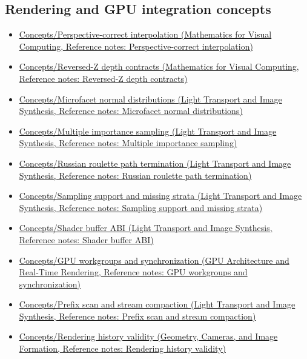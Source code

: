 \subsection{Rendering and GPU integration concepts}\label{appendix-a6d556a4ef50-rendering-and-gpu-integration-concepts}

\begin{itemize}
\tightlist
\item
  \href{../02-Mathematics-for-Visual-Computing/main.pdf\#nameddest=appendix-1ed5f96c73ea}{Concepts/Perspective-correct interpolation (Mathematics for Visual Computing, Reference notes: Perspective-correct interpolation)}
\item
  \href{../02-Mathematics-for-Visual-Computing/main.pdf\#nameddest=appendix-275ec8847057}{Concepts/Reversed-Z depth contracts (Mathematics for Visual Computing, Reference notes: Reversed-Z depth contracts)}
\item
  \href{../04-Light-Transport-and-Image-Synthesis/main.pdf\#nameddest=appendix-885c1cb64ae9}{Concepts/Microfacet normal distributions (Light Transport and Image Synthesis, Reference notes: Microfacet normal distributions)}
\item
  \href{../04-Light-Transport-and-Image-Synthesis/main.pdf\#nameddest=appendix-ca8898faf1a6}{Concepts/Multiple importance sampling (Light Transport and Image Synthesis, Reference notes: Multiple importance sampling)}
\item
  \href{../04-Light-Transport-and-Image-Synthesis/main.pdf\#nameddest=appendix-7277c62d4599}{Concepts/Russian roulette path termination (Light Transport and Image Synthesis, Reference notes: Russian roulette path termination)}
\item
  \href{../04-Light-Transport-and-Image-Synthesis/main.pdf\#nameddest=appendix-10308c3d753e}{Concepts/Sampling support and missing strata (Light Transport and Image Synthesis, Reference notes: Sampling support and missing strata)}
\item
  \href{../04-Light-Transport-and-Image-Synthesis/main.pdf\#nameddest=appendix-749048795dbb}{Concepts/Shader buffer ABI (Light Transport and Image Synthesis, Reference notes: Shader buffer ABI)}
\item
  \href{../06-GPU-Architecture-and-Real-Time-Rendering/main.pdf\#nameddest=appendix-f662b5b1773b}{Concepts/GPU workgroups and synchronization (GPU Architecture and Real-Time Rendering, Reference notes: GPU workgroups and synchronization)}
\item
  \href{../04-Light-Transport-and-Image-Synthesis/main.pdf\#nameddest=appendix-f2ee4d086415}{Concepts/Prefix scan and stream compaction (Light Transport and Image Synthesis, Reference notes: Prefix scan and stream compaction)}
\item
  \href{../03-Geometry-Cameras-and-Image-Formation/main.pdf\#nameddest=appendix-2e7e9fd28a2c}{Concepts/Rendering history validity (Geometry, Cameras, and Image Formation, Reference notes: Rendering history validity)}
\end{itemize}

